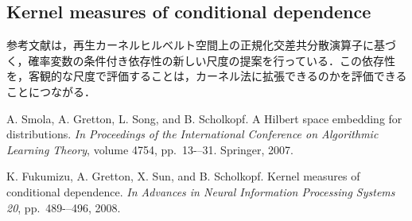 \documentclass[10pt,onecolumn]{jsarticle}
\begin{document}
\subsection{Kernel measures of conditional dependence}
参考文献\cite{ref2}は，再生カーネルヒルベルト空間上の正規化交差共分散演算子に基づく，確率変数の条件付き依存性の新しい尺度の提案を行っている．この依存性を，客観的な尺度で評価することは，カーネル法に拡張できるのかを評価できることにつながる．

\begin{thebibliography}{99}
%
A. Smola, A. Gretton, L. Song, and B. Scholkopf. A Hilbert space embedding for distributions. \textit{In Proceedings of the International Conference on Algorithmic Learning Theory}, volume 4754, pp.~13-–31. Springer, 2007.

K. Fukumizu, A. Gretton, X. Sun, and B. Scholkopf. Kernel measures of conditional dependence.
\textit{In Advances in Neural Information Processing Systems 20}, pp.~489-–496, 2008.


%
\end{thebibliography}



\end{document}
